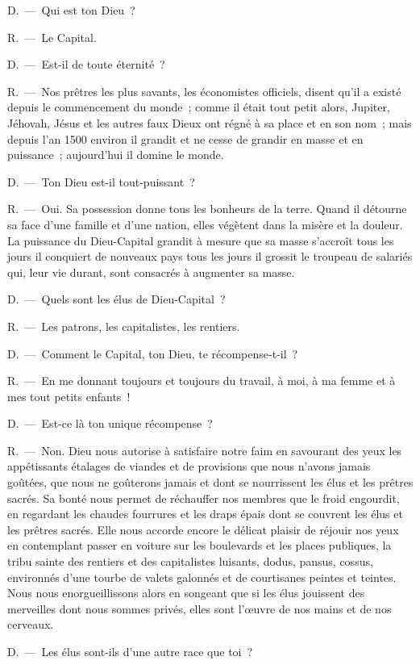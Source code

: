 \documentclass[french,twoside]{book} %
\begin{document}
D. — Qui est ton Dieu ?\par
R. — Le Capital.\par
D. — Est-il de toute éternité ?\par
R. — Nos prêtres les plus savants, les économistes officiels, disent qu’il a existé depuis le commencement du monde ; comme il était tout petit alors, Jupiter, Jéhovah, Jésus et les autres faux Dieux ont régné à sa place et en son nom ; mais depuis l’an 1500 environ il grandit et ne cesse de grandir en masse et en puissance ; aujourd’hui il domine le monde.\par
D. — Ton Dieu est-il tout-puissant ?\par
R. — Oui. Sa possession donne tous les bonheurs de la terre. Quand il détourne sa face d’une famille et d’une nation, elles végètent dans la misère et la douleur. La puissance du Dieu-Capital grandit à mesure que sa masse s’accroît tous les jours il conquiert de nouveaux pays tous les jours il grossit le troupeau de salariés qui, leur vie durant, sont consacrés à augmenter sa masse.\par
D. — Quels sont les élus de Dieu-Capital ?\par
R. — Les patrons, les capitalistes, les rentiers.\par
D. — Comment le Capital, ton Dieu, te récompense-t-il ?\par
R. — En me donnant toujours et toujours du travail, à moi, à ma femme et à mes tout petits enfants !\par
D. — Est-ce là ton unique récompense ?\par
R. — Non. Dieu nous autorise à satisfaire notre faim en savourant des yeux les appétissants étalages de viandes et de provisions que nous n’avons jamais goûtées, que nous ne goûterons jamais et dont se nourrissent les élus et les prêtres sacrés. Sa bonté nous permet de réchauffer nos membres que le froid engourdit, en regardant les chaudes fourrures et les draps épais dont se couvrent les élus et les prêtres sacrés. Elle nous accorde encore le délicat plaisir de réjouir nos yeux en contemplant passer en voiture sur les boulevards et les places publiques, la tribu sainte des rentiers et des capitalistes luisants, dodus, pansus, cossus, environnés d’une tourbe de valets galonnés et de courtisanes peintes et teintes. Nous nous enorgueillissons alors en songeant que si les élus jouissent des merveilles dont nous sommes privés, elles sont l’œuvre de nos mains et de nos cerveaux.\par
D. — Les élus sont-ils d’une autre race que toi ?\par
\end{document}

